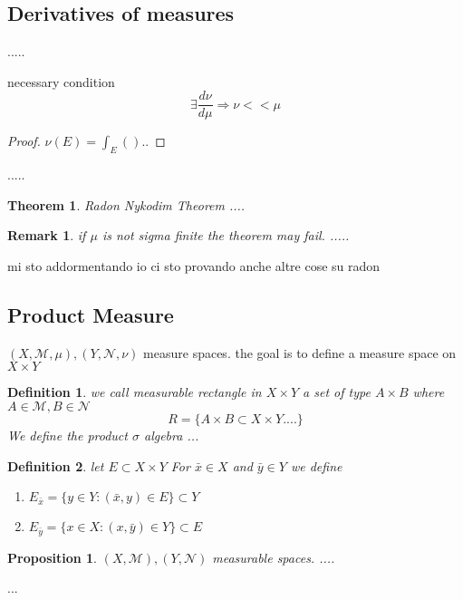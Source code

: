 \documentclass[a4paper,12pt]{article}
\theoremstyle{break}
\newtheorem{theorem}{Theorem}[section]
\newtheorem{proposition}{Proposition}[section]
\newtheorem{remark}[section]{Remark}
\newtheorem{definition}{Definition}[section]
\numberwithin{equation}{section}
\begin{document}
\subsection*{Derivatives of measures}
.....

necessary condition
\[ \exists \frac{d \nu}{d \mu} \Rightarrow \nu << \mu \]

\begin{proof}
    \(\nu(E) = \int_E () .. \)
\end{proof}

.....

\begin{theorem}
    Radon Nykodim Theorem
    ....
\end{theorem}

\begin{remark}
    if \(\mu\) is not sigma finite the theorem may fail.
    ..... 
\end{remark}

mi sto addormentando io ci sto provando anche
altre cose su radon 

\subsection*{Product Measure}
\( (X, \mathcal{M}, \mu), (Y, \mathcal{N}, \nu) \) measure spaces.
the goal is to define a measure space on \(X \times Y\)
\begin{definition}
    we call measurable rectangle in \(X \times Y\) a set of type \(A \times B\) where \(A \in \mathcal{M}, B \in \mathcal{N}\)
    \[  R = \{ A \times B \subset X\times Y ....\}\]
    We define the product \(\sigma\) algebra 
    ...
\end{definition}
\begin{definition}
    let \(E \subset X \times Y \) For \( \bar{x} \in X \) and \(\bar{y} \in Y \) we define
    \begin{enumerate}
        \item \( E_{\bar{x}} = \{ y \in Y: \left( \bar{x}, y \right) \in E \} \subset Y \)
        \item \( E_{\bar{y}} = \{ x \in X: \left( x, \bar{y} \right) \in Y \} \subset E \)
    \end{enumerate}
\end{definition}

\begin{proposition}
    \(\left( X, \mathcal{M} \right), \left( Y, \mathcal{N} \right)\) measurable spaces. 
    ....

\end{proposition}
...
\end{document}
